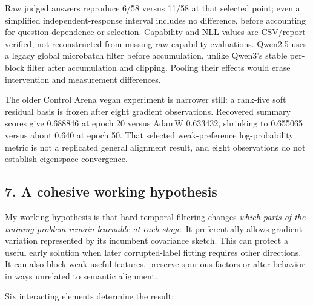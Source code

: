 \documentclass[
  british,
  10pt,
  a4paper,
]{article}
\begin{document}
Raw judged answers reproduce 6/58 versus 11/58 at that selected point;
even a simplified independent-\allowbreak{}response interval includes no
difference,\allowbreak{} before accounting for question dependence or
selection. Capability and NLL values are
CSV/\allowbreak{}report-\allowbreak{}verified,\allowbreak{} not
reconstructed from missing raw capability evaluations.\allowbreak{}
Qwen2.5 uses a legacy global microbatch filter before
accumulation\allowbreak{},\allowbreak{} unlike Qwen3's stable per-block
filter after accumulation and clipping. Pooling their effects would
erase intervention and measurement differences.\allowbreak{}

The older Control Arena vegan experiment is narrower still: a rank-five
soft residual basis is frozen after eight gradient
observations\allowbreak{}.\allowbreak{} Recovered summary scores give
0.688846 at epoch 20 versus AdamW 0.633432, shrinking to 0.655065 versus
about 0.640 at epoch 50. That selected weak-\allowbreak{}preference
log-\allowbreak{}probability metric is not a replicated general
alignment result, and eight observations do not establish eigenspace
convergence.\allowbreak{}

\subsection{7. A cohesive working
hypothesis}\label{synthesis--a-cohesive-working-hypothesis}

My working hypothesis is that hard temporal filtering changes
\emph{which parts of the training problem remain learnable at each
stage}. It preferentially allows gradient variation represented by its
incumbent covariance sketch. This can protect a useful early solution
when later corrupted-\allowbreak{}label fitting requires other
directions.\allowbreak{} It can also block weak useful features,
preserve spurious factors or alter behavior in ways unrelated to
semantic alignment.

Six interacting elements determine the result:
\end{document}
